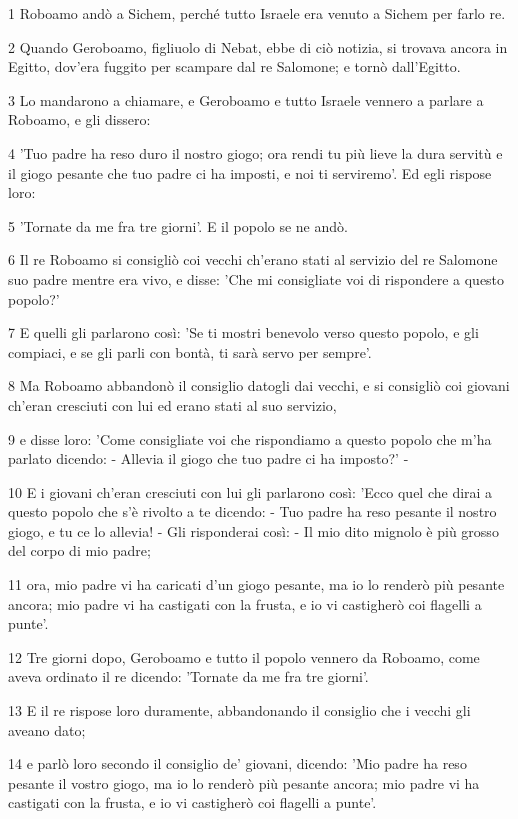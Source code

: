 \par 1 Roboamo andò a Sichem, perché tutto Israele era venuto a Sichem per farlo re.
\par 2 Quando Geroboamo, figliuolo di Nebat, ebbe di ciò notizia, si trovava ancora in Egitto, dov'era fuggito per scampare dal re Salomone; e tornò dall'Egitto.
\par 3 Lo mandarono a chiamare, e Geroboamo e tutto Israele vennero a parlare a Roboamo, e gli dissero:
\par 4 'Tuo padre ha reso duro il nostro giogo; ora rendi tu più lieve la dura servitù e il giogo pesante che tuo padre ci ha imposti, e noi ti serviremo'. Ed egli rispose loro:
\par 5 'Tornate da me fra tre giorni'. E il popolo se ne andò.
\par 6 Il re Roboamo si consigliò coi vecchi ch'erano stati al servizio del re Salomone suo padre mentre era vivo, e disse: 'Che mi consigliate voi di rispondere a questo popolo?'
\par 7 E quelli gli parlarono così: 'Se ti mostri benevolo verso questo popolo, e gli compiaci, e se gli parli con bontà, ti sarà servo per sempre'.
\par 8 Ma Roboamo abbandonò il consiglio datogli dai vecchi, e si consigliò coi giovani ch'eran cresciuti con lui ed erano stati al suo servizio,
\par 9 e disse loro: 'Come consigliate voi che rispondiamo a questo popolo che m'ha parlato dicendo: - Allevia il giogo che tuo padre ci ha imposto?' -
\par 10 E i giovani ch'eran cresciuti con lui gli parlarono così: 'Ecco quel che dirai a questo popolo che s'è rivolto a te dicendo: - Tuo padre ha reso pesante il nostro giogo, e tu ce lo allevia! - Gli risponderai così: - Il mio dito mignolo è più grosso del corpo di mio padre;
\par 11 ora, mio padre vi ha caricati d'un giogo pesante, ma io lo renderò più pesante ancora; mio padre vi ha castigati con la frusta, e io vi castigherò coi flagelli a punte'.
\par 12 Tre giorni dopo, Geroboamo e tutto il popolo vennero da Roboamo, come aveva ordinato il re dicendo: 'Tornate da me fra tre giorni'.
\par 13 E il re rispose loro duramente, abbandonando il consiglio che i vecchi gli aveano dato;
\par 14 e parlò loro secondo il consiglio de' giovani, dicendo: 'Mio padre ha reso pesante il vostro giogo, ma io lo renderò più pesante ancora; mio padre vi ha castigati con la frusta, e io vi castigherò coi flagelli a punte'.

